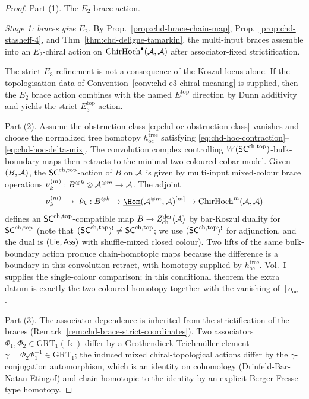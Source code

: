 \begin{proof}
Part (1). The $E_2$ brace action.

\emph{Stage 1: braces give $E_2$.} By Prop.~\ref{prop:chd-brace-chain-map},
Prop.~\ref{prop:chd-stasheff-4}, and Thm~\ref{thm:chd-deligne-tamarkin},
the multi-input braces assemble into an $E_2$-chiral action on
$\mathrm{ChirHoch}^\bullet(\mathcal{A}, \mathcal{A})$ after associator-fixed strictification.

The strict $E_3$ refinement is not a consequence of the Koszul locus
alone. If the topologisation data of
Convention~\ref{conv:chd-e3-chiral-meaning} is supplied, then the
$E_2$ brace action combines with the named $E_1^{\mathrm{top}}$
direction by Dunn additivity and yields the strict
$E_3^{\mathrm{top}}$ action.

Part (2). Assume the obstruction class
\eqref{eq:chd-oc-obstruction-class} vanishes and choose the normalized
tree homotopy \(h_{\mathrm{oc}}^{\mathrm{tree}}\) satisfying
\eqref{eq:chd-hoc-contraction}--\eqref{eq:chd-hoc-delta-mix}. The
convolution complex controlling \(W(\mathsf{SC}^{\mathrm{ch},\mathrm{top}})\)-bulk-boundary maps
then retracts to the minimal two-coloured cobar model. Given
$(B, \mathcal{A})$, the $\mathsf{SC}^{\mathrm{ch},\mathrm{top}}$-action of $B$ on
$\mathcal{A}$ is given by multi-input mixed-colour brace operations
$\nu_k^{(m)}: B^{\otimes k}\otimes \mathcal{A}^{\otimes m}\to \mathcal{A}$. The adjoint
\[
 \nu_k^{(m)} \;\mapsto\; \hat{\nu}_k:
 B^{\otimes k} \to \underline{\Hom}(\cA^{\otimes m}, \cA)^{[m]} \to
 \ChirHoch^m(\cA, \cA)
\]
defines an $\mathsf{SC}^{\mathrm{ch},\mathrm{top}}$-compatible map $B \to Z^{\mathrm{der}}_{\mathrm{ch}}(\mathcal{A})$ by
bar-Koszul duality for $\mathsf{SC}^{\mathrm{ch},\mathrm{top}}$ (note that
$(\mathsf{SC}^{\mathrm{ch},\mathrm{top}})^! \ne \mathsf{SC}^{\mathrm{ch},\mathrm{top}}$; we use $(\mathsf{SC}^{\mathrm{ch},\mathrm{top}})^!$ for adjunction,
and the dual is $(\mathsf{Lie}, \mathsf{Ass})$ with shuffle-mixed closed colour). Two
lifts of the same bulk-boundary action produce chain-homotopic maps
because the difference is a boundary in this convolution retract,
with homotopy supplied by \(h_{\mathrm{oc}}^{\mathrm{tree}}\). Vol.~I
supplies the single-colour comparison; in this conditional theorem the
extra datum is exactly the two-coloured homotopy together with the
vanishing of \([o_{\mathrm{oc}}]\).

Part (3). The associator dependence is inherited from the
strictification of the braces (Remark~\ref{rem:chd-brace-strict-coordinates}).
Two associators $\Phi_1, \Phi_2 \in \mathrm{GRT}_1(\Bbbk)$ differ
by a Grothendieck-Teichm\"uller element
$\gamma = \Phi_2 \Phi_1^{-1}\in \mathrm{GRT}_1$; the induced
mixed chiral-topological actions differ by the $\gamma$-conjugation
automorphism, which is an identity on cohomology
(Drinfeld-Bar-Natan-Etingof) and chain-homotopic to the identity by
an explicit Berger-Fresse-type homotopy.
\end{proof}

